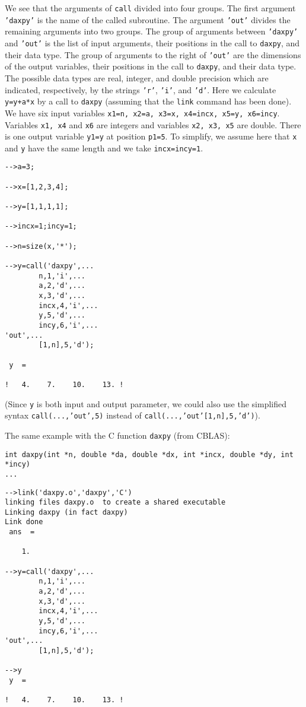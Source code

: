 We see that the arguments of {\tt call}  divided into four groups.
The first argument {\tt 'daxpy'} is the name of the called subroutine.
The argument {\tt 'out'} divides the remaining arguments into two 
groups.  The group of arguments between {\tt 'daxpy'} and {\tt 'out'}
is the list of input arguments, their positions in the call to {\tt daxpy},
and their data type.  The group of arguments to the right of {\tt 'out'}
are the dimensions of the output variables, their positions in the call
to {\tt daxpy}, and their data type.
The possible data types are real, integer, and double precision which
are indicated, respectively, by the strings {\tt 'r'}, {\tt 'i'}, and
{\tt 'd'}.  
Here we calculate {\tt y=y+a*x} by a call to {\tt daxpy} (assuming
that the {\tt link} command has been done).
We have six input variables 
{\tt x1=n, x2=a, x3=x, x4=incx, x5=y, x6=incy}.
Variables {\tt x1, x4} and {\tt x6} are integers and variables
{\tt x2, x3, x5} are double. There is one output variable {\tt y1=y}
at position {\tt p1=5}. To simplify, we assume here that {\tt x} and
{\tt y} have the same length and we take {\tt incx=incy=1}.
\begin{verbatim}
-->a=3;
 
-->x=[1,2,3,4];
 
-->y=[1,1,1,1];
 
-->incx=1;incy=1;

-->n=size(x,'*');

-->y=call('daxpy',...
        n,1,'i',...
        a,2,'d',...
        x,3,'d',...
        incx,4,'i',...
        y,5,'d',...
        incy,6,'i',...
'out',...
        [1,n],5,'d');

 y  =
 
!   4.    7.    10.    13. !

\end{verbatim}
(Since {\tt y} is both input and output parameter, we could also use
the simplified syntax 
{\tt call(...,'out',5)} instead of {\tt call(...,'out'[1,n],5,'d')}). 

The same example with the C function {\tt daxpy} (from CBLAS):
\begin{verbatim}
int daxpy(int *n, double *da, double *dx, int *incx, double *dy, int *incy)
...
\end{verbatim}

\begin{verbatim}
-->link('daxpy.o','daxpy','C')
linking files daxpy.o  to create a shared executable
Linking daxpy (in fact daxpy)
Link done
 ans  =
 
    1.  

-->y=call('daxpy',...
        n,1,'i',...
        a,2,'d',...
        x,3,'d',...
        incx,4,'i',...
        y,5,'d',...
        incy,6,'i',...
'out',...
        [1,n],5,'d');
 
-->y
 y  =
 
!   4.    7.    10.    13. !
\end{verbatim}

